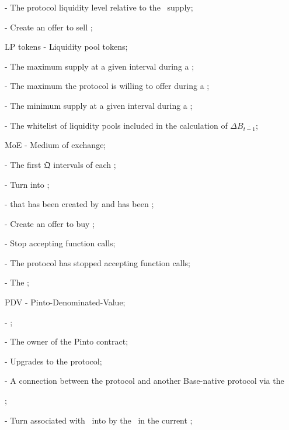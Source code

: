 \documentclass[class=article, crop=false]{standalone}
\begin{document}
\begin{itemize}[topsep=0pt, itemsep=2pt,leftmargin=16pt]
{    \item[]  - The protocol liquidity level relative to the \Pinto\ supply;
    \item[]  - Create an offer to sell ;
    \item[] LP tokens - Liquidity pool tokens;
    \item[]  - The maximum  supply at a given interval during a ;
    \item[]  - The maximum  the protocol is willing to offer during a ;
    \item[]  - The minimum  supply at a given interval during a ;
    \item[]  - The whitelist of liquidity pools included in the calculation of $\Delta B_{\overline{t-1}}$;
    \item[] MoE - Medium of exchange;
    \item[]  - The first $\mathfrak{Q}$ intervals of each ;
    \item[]  - Turn  into ;
    \item[]  -  that has been created by  and has been ;
    \item[]  - Create an offer to buy ;
    \item[]  - Stop accepting  function calls;
    \item[]  - The protocol has stopped accepting  function calls;
    \item[]  - The ;
    \item[] PDV - Pinto-Denominated-Value;
    \item[]  - ;
    \item[]  - The owner of the Pinto contract;
    \item[]  - Upgrades to the protocol;    
    \item[]  - A connection between the protocol and another Base-native protocol via the };
    \item[]  - Turn  associated with  \Pinto\ into  by  the  \Pinto\ in the current ;

\end{itemize}
\end{document}
